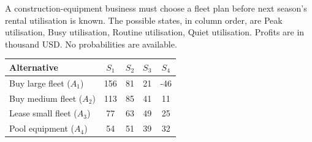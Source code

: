 \clearpage
{}
A construction-equipment business must choose a fleet plan before next season's rental utilisation is known. The possible states, in column order, are Peak utilisation, Busy utilisation, Routine utilisation, Quiet utilisation. Profits are in thousand USD. No probabilities are available.
\begin{center}
\begin{tabular}{@{}lcccc@{}}\toprule
Alternative & $S_1$ & $S_2$ & $S_3$ & $S_4$\\\midrule
Buy large fleet ($A_1$) & 156 & 81 & 21 & -46\\
Buy medium fleet ($A_2$) & 113 & 85 & 41 & 11\\
Lease small fleet ($A_3$) & 77 & 63 & 49 & 25\\
Pool equipment ($A_4$) & 54 & 51 & 39 & 32\\
\bottomrule\end{tabular}
\end{center}
